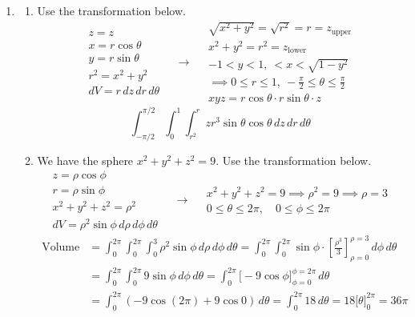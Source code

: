 \documentclass[a4paper, 12pt]{article}
\begin{document}
\begin{enumerate}[leftmargin=*,label=\textbf{\arabic*.}]
\item \begin{enumerate}[leftmargin=*,label=\textbf{\alph*.}]
\item Use the transformation below.
\[
\begin{array}{c}
z=z\\
x=r\cos\theta\\
y=r\sin\theta\\
r^2=x^2+y^2\\
dV=r\,dz\,dr\,d\theta
\end{array}\quad\rightarrow\quad
\begin{array}{c}
\sqrt{x^2+y^2}=\sqrt{r^2}=r=z_{\text{upper}}\\
x^2+y^2=r^2=z_{\text{lower}}\\[1em]
\displaystyle-1<y<1,\:<x<\sqrt{1-y^2}\\\implies0\leq r\leq1,\:-\frac\pi2\leq\theta\leq\frac\pi2\\[1em]
xyz=r\cos\theta\cdot r\sin\theta\cdot z
\end{array}
\]
\[\boxed{\int_{-\pi/2}^{\pi/2}\int_0^1\int_{r^2}^rzr^3\sin\theta\cos\theta\,dz\,dr\,d\theta}\]

\item We have the sphere $x^2+y^2+z^2=9$. Use the transformation below.
\[
\begin{array}{c}
z=\rho\cos\phi\\
r=\rho\sin\phi\\
x^2+y^2+z^2=\rho^2\\
dV=\rho^2\sin\phi\,d\rho\,d\phi\,d\theta
\end{array}\quad\rightarrow\quad
\begin{array}{c}
x^2+y^2+z^2=9\implies\rho^2=9\implies\rho=3\\[1em]
0\leq\theta\leq2\pi,\quad0\leq\phi\leq2\pi
\end{array}
\]
\begin{align*}
\text{Volume}&=\int_0^{2\pi}\int_0^{2\pi}\int_0^{3}\rho^2\sin\phi\,d\rho\,d\phi\,d\theta=\int_0^{2\pi}\int_0^{2\pi}\sin\phi\cdot\left[\frac{\rho^3}3\right]_{\rho=0}^{\rho=3}\,d\phi\,d\theta\\[1em]&=\int_0^{2\pi}\int_0^{2\pi}9\sin\phi\,d\phi\,d\theta=\int_0^{2\pi}\bigg[-9\cos\phi\bigg]_{\phi=0}^{\phi=2\pi}\,d\theta\\[1em]&=\int_0^{2\pi}\left(-9\cos(2\pi)+9\cos0\right)\,d\theta=\int_0^{2\pi}18\,d\theta=18\bigg[\theta\bigg]_0^{2\pi}=\boxed{36\pi}
\end{align*}
\end{enumerate}


\end{enumerate}
\end{document}
